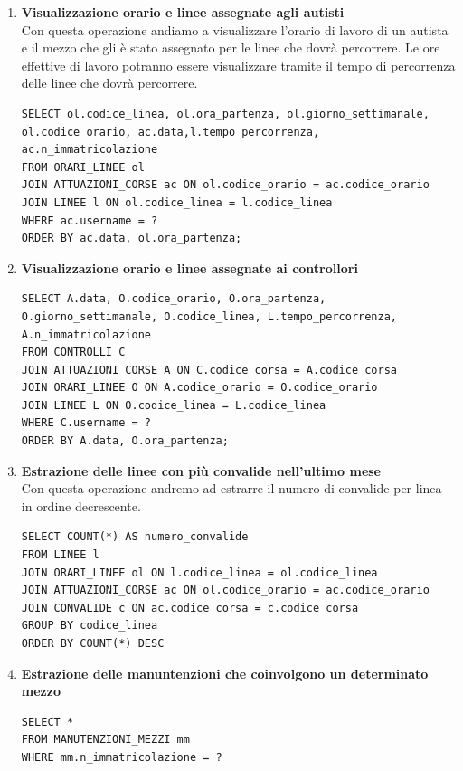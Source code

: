 \documentclass[12pt,a4paper]{report}
\begin{document}
\begin{enumerate}[label=\textbf{\arabic*)}]
\item \textbf{Visualizzazione orario e linee assegnate agli autisti} \\
Con questa operazione andiamo a visualizzare l'orario di lavoro di un autista e il mezzo che gli è stato assegnato per le linee che dovrà percorrere. Le ore effettive di lavoro potranno essere visualizzare tramite il tempo di percorrenza delle linee che dovrà percorrere.
\begin{lstlisting}[style=sqlstyle, caption=Query for Corse Attuate by User]
SELECT ol.codice_linea, ol.ora_partenza, ol.giorno_settimanale, ol.codice_orario, ac.data,l.tempo_percorrenza, ac.n_immatricolazione
FROM ORARI_LINEE ol
JOIN ATTUAZIONI_CORSE ac ON ol.codice_orario = ac.codice_orario
JOIN LINEE l ON ol.codice_linea = l.codice_linea
WHERE ac.username = ?
ORDER BY ac.data, ol.ora_partenza;
\end{lstlisting}

\item \textbf{Visualizzazione orario e linee assegnate ai controllori} \\
\begin{lstlisting}[style=sqlstyle]
SELECT A.data, O.codice_orario, O.ora_partenza, O.giorno_settimanale, O.codice_linea, L.tempo_percorrenza, A.n_immatricolazione
FROM CONTROLLI C
JOIN ATTUAZIONI_CORSE A ON C.codice_corsa = A.codice_corsa
JOIN ORARI_LINEE O ON A.codice_orario = O.codice_orario
JOIN LINEE L ON O.codice_linea = L.codice_linea
WHERE C.username = ?
ORDER BY A.data, O.ora_partenza;
\end{lstlisting}

\item \textbf{Estrazione delle linee con più convalide nell’ultimo mese} \\
Con questa operazione andremo ad estrarre il numero di convalide per linea in ordine decrescente.
\begin{lstlisting}[style=sqlstyle, caption=Query for Number of Validations per Linea]
SELECT COUNT(*) AS numero_convalide
FROM LINEE l
JOIN ORARI_LINEE ol ON l.codice_linea = ol.codice_linea
JOIN ATTUAZIONI_CORSE ac ON ol.codice_orario = ac.codice_orario
JOIN CONVALIDE c ON ac.codice_corsa = c.codice_corsa
GROUP BY codice_linea
ORDER BY COUNT(*) DESC
\end{lstlisting}

\item \textbf{Estrazione delle manuntenzioni che coinvolgono un determinato mezzo} \\
\begin{lstlisting}[style=sqlstyle]
SELECT *
FROM MANUTENZIONI_MEZZI mm
WHERE mm.n_immatricolazione = ?
\end{lstlisting}


\end{enumerate}
\end{document}
